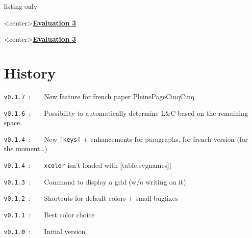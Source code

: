 \documentclass[a4paper]{article}
\begin{document}
\begin{PresentationCode}{listing only}
\begin{PleinePageRuled}[NumLignes]
	\LignePapierRuled[Echelle=1.25,Ligne=2,Couleur=red]<center>{\underline{\cursive\bfseries Evaluation 3}}
	\ParagraphePapierRuled[Ligne=9]{\cursive\lipsum[1]}
\end{PleinePageRuled}
\end{PresentationCode}

\pagebreak

\thispagestyle{empty}

\begin{PleinePageRuled}
	\LignePapierRuled[Echelle=1.25,Ligne=2,Couleur=red]<center>{\underline{\cursive\bfseries Evaluation 3}}
	\ParagraphePapierRuled[Ligne=9]{\cursive\lipsum[1]}
\end{PleinePageRuled}

\pagebreak

\part*{History}

\verb|v0.1.7|~:~~~~New feature for french paper \textsf{PleinePageCinqCinq}

\verb|v0.1.6|~:~~~~Possibility to automatically determine L\&C based on the remaining space.

\verb|v0.1.4|~:~~~~New \texttt{[keys]} + enhancements for paragraphs, for french version (for the moment\dots)

\verb|v0.1.4|~:~~~~\texttt{xcolor} isn't loaded with \textsf{[table,svgnames]})

\verb|v0.1.3|~:~~~~Command to display a grid (w/o writing on it)

\verb|v0.1.2|~:~~~~Shortcuts for default colors + small bugfixes

\verb|v0.1.1|~:~~~~Best color choice

\verb|v0.1.0|~:~~~~Initial version
\end{document}
